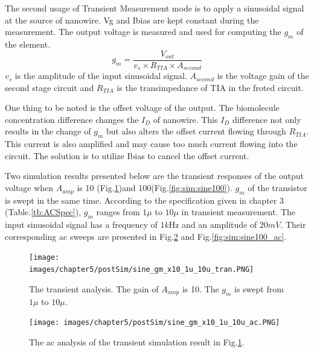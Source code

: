 {The second usage of Transient Measurement mode is to apply a sinusoidal signal at the source of nanowire.
Vg and Ibias are kept constant during the measurement.
The output voltage is measured and used for computing the $g_m$ of the element.
\begin{equation}
    g_m = \frac{V_{out}}{v_s \times R_{TIA} \times A_{second}}
\end{equation}
$v_s$ is the amplitude of the input sinusoidal signal.
$A_{second}$ is the voltage gain of the second stage circuit and $R_{TIA}$ is the transimpedance of TIA in the froted circuit.

One thing to be noted is the offset voltage of the output.
The biomolecule concentration difference changes the $I_D$ of nanowire.
This $I_D$ difference not only results in the change of $g_m$ but also alters the offset current flowing through $R_{TIA}$.
This current is also amplified and may cause too much current flowing into the circuit.
The solution is to utilize Ibias to cancel the offset current.

Two simulation results presented below are the transient responses of the output voltage when $A_{amp}$ is 10 (Fig.\ref{fig:sim:sine10})and 100(Fig.\ref{fig:sim:sine100}).
$g_m$ of the transistor is swept in the same time.
According to the specification given in chapter 3 (Table.\ref{tb:ACSpec}), $g_m$ ranges from $1\mu$ to $10\mu$ in transient measurement.
The input sinusoidal signal has a frequency of $1k$Hz and an amplitude of $20mV$.
Their corresponding ac sweeps are presented in Fig.\ref{fig:sim:sine10_ac} and Fig.\ref{fig:sim:sine100_ac}.


\begin{figure}[!htbp]
    \centering
        \texttt{[image: images/chapter5/postSim/sine\_gm\_x10\_1u\_10u\_tran.PNG]}
    \caption{The transient analysis. The gain of $A_{amp}$ is 10. The $g_m$ is swept from $1\mu$ to $10\mu$.}
    \label{fig:sim:sine10}
\end{figure}
\begin{figure}[!htbp]
    \centering
        \texttt{[image: images/chapter5/postSim/sine\_gm\_x10\_1u\_10u\_ac.PNG]}
    \caption{The ac analysis of the transient simulation result in Fig.\ref{fig:sim:sine10}.}
    \label{fig:sim:sine10_ac}
\end{figure}

}

